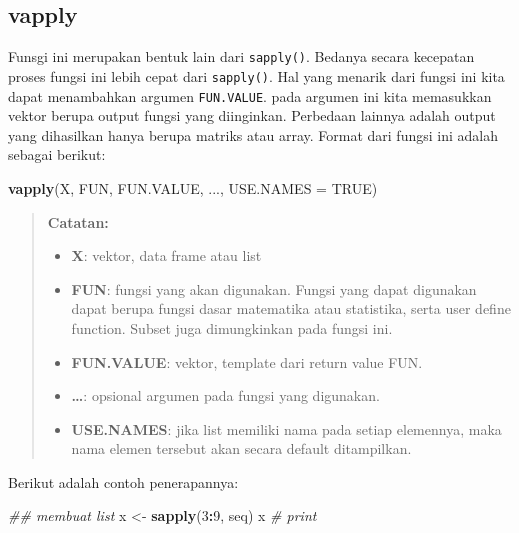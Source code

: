 \documentclass[]{book}
\newenvironment{Shaded}{\begin{snugshade}}{\end{snugshade}}
\newcommand{\CommentTok}[1]{\textcolor[rgb]{0.56,0.35,0.01}{\textit{#1}}}
\newcommand{\DataTypeTok}[1]{\textcolor[rgb]{0.13,0.29,0.53}{#1}}
\newcommand{\DecValTok}[1]{\textcolor[rgb]{0.00,0.00,0.81}{#1}}
\newcommand{\KeywordTok}[1]{\textcolor[rgb]{0.13,0.29,0.53}{\textbf{#1}}}
\newcommand{\NormalTok}[1]{#1}
\newcommand{\OperatorTok}[1]{\textcolor[rgb]{0.81,0.36,0.00}{\textbf{#1}}}
\newcommand{\OtherTok}[1]{\textcolor[rgb]{0.56,0.35,0.01}{#1}}
\newcommand{\StringTok}[1]{\textcolor[rgb]{0.31,0.60,0.02}{#1}}
\providecommand{\tightlist}{%
  \setlength{\itemsep}{0pt}\setlength{\parskip}{0pt}}
\theoremstyle{definition}
\theoremstyle{definition}
\theoremstyle{definition}
\theoremstyle{remark}
\begin{document}
\hypertarget{vapply}{%
\subsection{vapply}\label{vapply}}

Funsgi ini merupakan bentuk lain dari \texttt{sapply()}. Bedanya secara kecepatan proses fungsi ini lebih cepat dari \texttt{sapply()}. Hal yang menarik dari fungsi ini kita dapat menambahkan argumen \texttt{FUN.VALUE}. pada argumen ini kita memasukkan vektor berupa output fungsi yang diinginkan. Perbedaan lainnya adalah output yang dihasilkan hanya berupa matriks atau array. Format dari fungsi ini adalah sebagai berikut:

\begin{Shaded}
\begin{Highlighting}[]
\KeywordTok{vapply}\NormalTok{(X, FUN, FUN.VALUE, ..., }\DataTypeTok{USE.NAMES =} \OtherTok{TRUE}\NormalTok{)}
\end{Highlighting}
\end{Shaded}

\begin{quote}
\textbf{Catatan:}

\begin{itemize}
\tightlist
\item
  \textbf{X}: vektor, data frame atau list
\item
  \textbf{FUN}: fungsi yang akan digunakan. Fungsi yang dapat digunakan dapat berupa fungsi dasar matematika atau statistika, serta user define function. Subset juga dimungkinkan pada fungsi ini.
\item
  \textbf{FUN.VALUE}: vektor, template dari return value FUN.
\item
  \textbf{\ldots{}}: opsional argumen pada fungsi yang digunakan.
\item
  \textbf{USE.NAMES}: jika list memiliki nama pada setiap elemennya, maka nama elemen tersebut akan secara default ditampilkan.
\end{itemize}
\end{quote}

Berikut adalah contoh penerapannya:

\begin{Shaded}
\begin{Highlighting}[]
\CommentTok{## membuat list}
\NormalTok{x <-}\StringTok{ }\KeywordTok{sapply}\NormalTok{(}\DecValTok{3}\OperatorTok{:}\DecValTok{9}\NormalTok{, seq)}
\NormalTok{x }\CommentTok{# print}
\end{Highlighting}
\end{Shaded}
\end{document}
